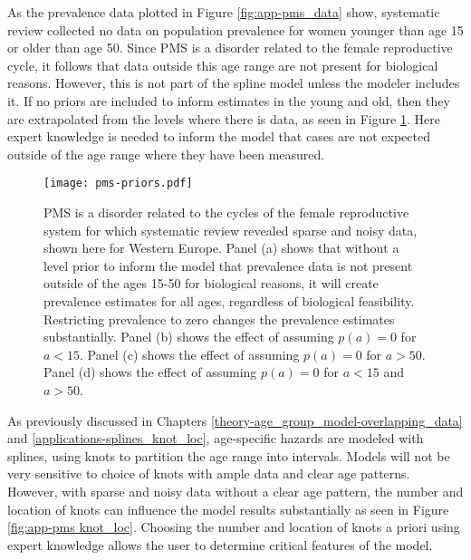 As the prevalence data plotted in Figure \ref{fig:app-pms_data} show,
systematic review collected no data on population prevalence for women
younger than age 15 or older than age 50.  Since PMS is a disorder
related to the female reproductive cycle, it follows
that data outside this age range are not present for biological
reasons.  However, this is not part of the spline model unless the
modeler includes it.  If no priors are included to inform
estimates in the young and old, then they are extrapolated from the
levels where there is data, as seen in Figure
\ref{fig:app-pms prios_on_level}.  Here expert knowledge is needed to
inform the model that cases are not expected outside of the age range
where they have been measured.

    \begin{figure}
        \begin{center}
            \texttt{[image: pms-priors.pdf]}
        \end{center}
        \caption{PMS is a disorder related to the cycles of the female
          reproductive system for which systematic review revealed
          sparse and noisy data, shown here for Western Europe.  Panel
          (a) shows that without a level prior to inform the model
          that prevalence data is not present outside of the ages
          15-50 for biological reasons, it will create prevalence
          estimates for all ages, regardless of biological
          feasibility.  Restricting prevalence to zero changes the
          prevalence estimates substantially. Panel (b) shows the
          effect of assuming $p(a) = 0$ for $a<15$. Panel (c) shows
          the effect of assuming $p(a) = 0$ for $a>50$. Panel (d)
          shows the effect of assuming $p(a) = 0$ for $a<15$ and
          $a>50$.}
        \label{fig:app-pms prios_on_level}
    \end{figure}

As previously discussed in Chapters
\ref{theory-age_group_model-overlapping_data} and
\ref{applications-splines_knot_loc}, age-specific hazards are modeled
with splines, using knots to partition the age range into intervals.
Models will not be very sensitive to choice of knots with ample data
and clear age patterns.  However, with sparse and noisy data without a
clear age pattern, the number and location of knots can influence the
model results substantially as seen in Figure \ref{fig:app-pms knot_loc}.
Choosing the number and location of knots a priori using expert
knowledge allows the user to determine critical features of the model.

